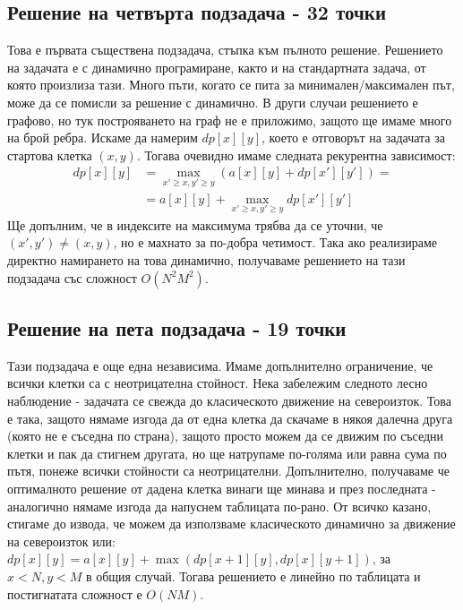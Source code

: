 \documentclass[12pt]{article}
\begin{document}
\subsection{Решение на четвърта подзадача - 32 точки}
Това е първата съществена подзадача, стъпка към пълното решение. Решението на задачата е с динамично програмиране, както и на стандартната задача, от която произлиза тази. Много пъти, когато се пита за минимален/максимален път, може да се помисли за решение с динамично. В други случаи решението е графово, но тук построяването на граф не е приложимо, защото ще имаме много на брой ребра. Искаме да намерим $dp[x][y]$, което е отговорът на задачата за стартова клетка $(x,y)$. Тогава очевидно имаме следната рекурентна зависимост:
\begin{equation*}
	\begin{split}
		dp[x][y]
		&= \max_{x' \ge x, y' \ge y}{(a[x][y]+dp[x'][y'])} =\\
		&= a[x][y]+\max_{x' \ge x, y' \ge y}{dp[x'][y']}
	\end{split}
\end{equation*}
Ще допълним, че в индексите на максимума трябва да се уточни, че $(x',y') \neq (x,y)$, но е махнато за по-добра четимост. Така ако реализираме директно намирането на това динамично, получаваме решението на тази подзадача със сложност $O(N^2M^2)$.

\subsection{Решение на пета подзадача - 19 точки}
Тази подзадача е още една независима. Имаме допълнително ограничение, че всички клетки са с неотрицателна стойност. Нека забележим следното лесно наблюдение - задачата се свежда до класическото движение на североизток. Това е така, защото нямаме изгода да от една клетка да скачаме в някоя далечна друга (която не е съседна по страна), защото просто можем да се движим по съседни клетки и пак да стигнем другата, но ще натрупаме по-голяма или равна сума по пътя, понеже всички стойности са неотрицателни. Допълнително, получаваме че оптималното решение от дадена клетка винаги ще минава и през последната - аналогично нямаме изгода да напуснем таблицата по-рано. От всичко казано, стигаме до извода, че можем да използваме класическото динамично за движение на североизток или: $dp[x][y] = a[x][y] + \max(dp[x+1][y],dp[x][y+1])$, за $x < N, y < M$ в общия случай. Тогава решението е линейно по таблицата и постигнатата сложност е $O(NM)$.
\end{document}
